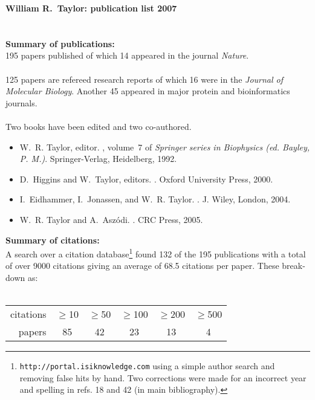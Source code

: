 
{\bf \LARGE
William R.~Taylor: publication list 2007\\ \\ \\
}
{\bf \large
Summary of publications:\\
}
195 papers published of which 14 appeared in the journal {\em Nature}.\\ \\
125 papers are refereed research reports of which 16 were in the
{\em Journal of Molecular Biology}.
Another 45 appeared in major protein and bioinformatics journals.\\ \\
Two books have been edited and two co-authored.
\begin{itemize}
\item
W.~R. Taylor, editor.
, volume~7 of {\em
  Springer series in Biophysics (ed. Bayley, P. M.)}.
\newblock Springer-Verlag, Heidelberg, 1992.
\item
D.~Higgins and W.~Taylor, editors.
.
\newblock Oxford University Press, 2000.
\item
I.~Eidhammer, I.~Jonassen, and W.~R. Taylor.
.
\newblock J. Wiley, London, 2004.
\item
W.~R. Taylor and A.~Asz\'odi.
.
\newblock CRC Press, 2005.
\end{itemize}
{\bf \large
Summary of citations:\\
}
A search over a citation database\footnote{
{\tt http://portal.isiknowledge.com} using a simple author search and removing
false hits by hand.  Two corrections were made for an incorrect year and spelling
in refs. 18 and 42 (in main bibliography).
}
found 132 of the 195 publications with a total of over 9000 citations giving an
average of 68.5 citations per paper.   These break-down as:\\ \\
\begin{centering}
\begin{tabular}{r|ccccc}
\hline
citations & $\ge$10 & $\ge$50 & $\ge$100 & $\ge$200 & $\ge$500 \\
papers    &      85 &      42 &       23 &       13 &        4 \\
\hline
\end{tabular}
\end{centering}
\clearpage


